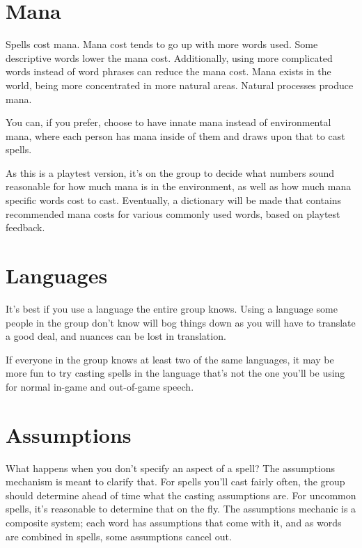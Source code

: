 \documentclass[10pt,a4paper,twocolumn,openany]{book}
\begin{document}
\section{Mana}
Spells cost mana.
Mana cost tends to go up with more words used.
Some descriptive words lower the mana cost.
Additionally, using more complicated words instead of word phrases can reduce the mana cost.
Mana exists in the world, being more concentrated in more natural areas.
Natural processes produce mana.

\begin{rpg-suggestionbox}
	You can, if you prefer, choose to have innate mana instead of environmental mana, where each person has mana inside of them and draws upon that to cast spells.
\end{rpg-suggestionbox}

\begin{rpg-commentbox}
	As this is a playtest version, it's on the group to decide what numbers sound reasonable for how much mana is in the environment, as well as how much mana specific words cost to cast.
	Eventually, a dictionary will be made that contains recommended mana costs for various commonly used words, based on playtest feedback.
\end{rpg-commentbox}

\section{Languages}
It's best if you use a language the entire group knows.
Using a language some people in the group don't know will bog things down as you will have to translate a good deal, and nuances can be lost in translation.

\begin{rpg-suggestionbox}
	If everyone in the group knows at least two of the same languages, it may be more fun to try casting spells in the language that's not the one you'll be using for normal in-game and out-of-game speech.
\end{rpg-suggestionbox}

\section{Assumptions}
What happens when you don't specify an aspect of a spell?
The assumptions mechanism is meant to clarify that.
For spells you'll cast fairly often, the group should determine ahead of time what the casting assumptions are.
For uncommon spells, it's reasonable to determine that on the fly.
The assumptions mechanic is a composite system; each word has assumptions that come with it, and as words are combined in spells, some assumptions cancel out.
\end{document}
